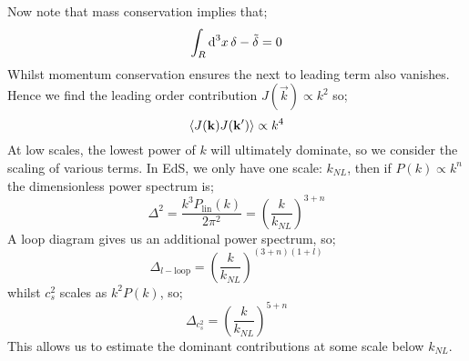Now note that mass conservation implies that;
\begin{equation*}
\int_R{\text{d}^3 x \, \delta - \tilde{\delta}} = 0
\end{equation*}
Whilst momentum conservation ensures the next to leading term also vanishes. Hence we find the leading order contribution $J(\vec{k}) \propto k^2$ so;
\begin{equation*}
\left< J(\vec{k}) J(\vec{k}\pr) \right> \propto k^4
\end{equation*}
At low scales, the lowest power of $k$ will ultimately dominate, so we consider the scaling of various terms. In EdS, we only have one scale: $k_{NL}$, then if $P(k) \propto k^n$ the dimensionless power spectrum is;
\begin{equation*}
\Delta^2 = \frac{k^3 P_{\text{lin}}(k)}{2\pi^2} = \left(\frac{k}{k_{NL}}\right)^{3 + n}
\end{equation*}
A loop diagram gives us an additional power spectrum, so;
\begin{equation*}
\Delta_{l-\text{loop}} = \left(\frac{k}{k_{NL}}\right)^{(3 + n)(1 + l)}
\end{equation*}
whilst $c_s^2$ scales as $k^2 P(k)$, so;
\begin{equation*}
\Delta_{c_s^2} = \left(\frac{k}{k_{NL}}\right)^{5 + n}
\end{equation*}
This allows us to estimate the dominant contributions at some scale below $k_{NL}$.

